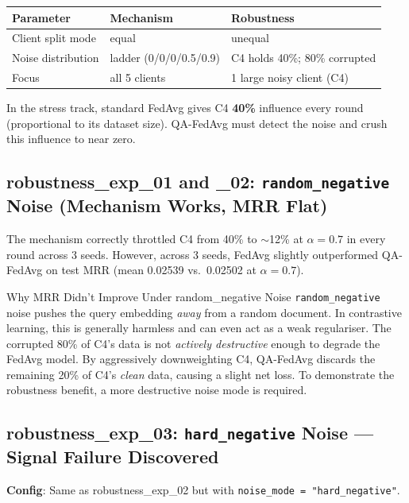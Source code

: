 \documentclass[12pt,a4paper]{article}
\begin{document}
\begin{center}
\renewcommand{\arraystretch}{1.4}
\begin{tabular}{lll}
\toprule
\textbf{Parameter} & \textbf{Mechanism} & \textbf{Robustness} \\
\midrule
Client split mode & equal & unequal \\
Noise distribution & ladder (0/0/0/0.5/0.9) & C4 holds 40\%; 80\% corrupted \\
Focus & all 5 clients & 1 large noisy client (C4) \\
\bottomrule
\end{tabular}
\end{center}

In the stress track, standard FedAvg gives C4 \textbf{40\%} influence every round (proportional to its dataset size). QA-FedAvg must detect the noise and crush this influence to near zero.

\subsection{robustness\_exp\_01 and \_02: \texttt{random\_negative} Noise (Mechanism Works, MRR Flat)}

The mechanism correctly throttled C4 from 40\% to $\sim$12\% at $\alpha=0.7$ in every round across 3 seeds. However, across 3 seeds, FedAvg slightly outperformed QA-FedAvg on test MRR (mean 0.02539 vs.\ 0.02502 at $\alpha=0.7$).

\begin{keybox}{Why MRR Didn't Improve Under random\_negative Noise}
  \texttt{random\_negative} noise pushes the query embedding \textit{away} from a random document. In contrastive learning, this is generally harmless and can even act as a weak regulariser. The corrupted 80\% of C4's data is not \textit{actively destructive} enough to degrade the FedAvg model. By aggressively downweighting C4, QA-FedAvg discards the remaining 20\% of C4's \textit{clean} data, causing a slight net loss. To demonstrate the robustness benefit, a more destructive noise mode is required.
\end{keybox}

\subsection{robustness\_exp\_03: \texttt{hard\_negative} Noise --- Signal Failure Discovered}

\textbf{Config}: Same as robustness\_exp\_02 but with \texttt{noise\_mode = "hard\_negative"}.
\end{document}
